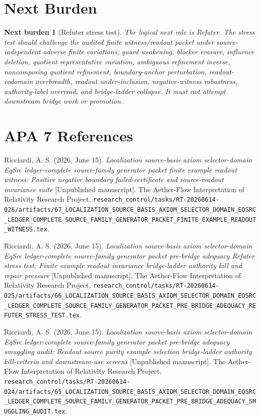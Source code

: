 \documentclass[11pt]{article}
\newtheorem{nextburden}{Next burden}
\begin{document}
\section{Next Burden}

\begin{nextburden}[Refuter stress test]
The logical next role is Refuter. The stress test should challenge the
audited finite witness/readout packet under source-independent adverse
finite variations: guard weakening, blocker erasure, influence deletion,
quotient representative variation, ambiguous refinement inverse,
noncomposing quotient refinement, boundary-anchor perturbation,
readout-codomain overbreadth, readout under-inclusion, negative-witness
robustness, authority-label overread, and bridge-ladder collapse. It
must not attempt downstream bridge work or promotion.
\end{nextburden}

\section*{APA 7 References}

Ricciardi, A. S. (2026, June 15). \emph{Localization source-basis axiom
selector-domain EqSrc ledger-complete source-family generator packet
finite example readout witness: Positive negative boundary
failed-certificate and source-readout invariance suite} [Unpublished
manuscript]. The Aether-Flow Interpretation of Relativity Research
Project,
\texttt{research\_control/tasks/RT-20260614-026/artifacts/67\_LOCALIZATION\_SOURCE\_BASIS\_AXIOM\_SELECTOR\_DOMAIN\_EQSRC\_LEDGER\_COMPLETE\_SOURCE\_FAMILY\_GENERATOR\_PACKET\_FINITE\_EXAMPLE\_READOUT\_WITNESS.tex}.

Ricciardi, A. S. (2026, June 15). \emph{Localization source-basis axiom
selector-domain EqSrc ledger-complete source-family generator packet
pre-bridge adequacy Refuter stress test: Finite example readout
invariance bridge-ladder authority kill and repair pressure}
[Unpublished manuscript]. The Aether-Flow Interpretation of Relativity
Research Project,
\texttt{research\_control/tasks/RT-20260614-025/artifacts/66\_LOCALIZATION\_SOURCE\_BASIS\_AXIOM\_SELECTOR\_DOMAIN\_EQSRC\_LEDGER\_COMPLETE\_SOURCE\_FAMILY\_GENERATOR\_PACKET\_PRE\_BRIDGE\_ADEQUACY\_REFUTER\_STRESS\_TEST.tex}.

Ricciardi, A. S. (2026, June 15). \emph{Localization source-basis axiom
selector-domain EqSrc ledger-complete source-family generator packet
pre-bridge adequacy smuggling audit: Readout source purity example
selection bridge-ladder authority kill-criteria and downstream-use
screens} [Unpublished manuscript]. The Aether-Flow Interpretation of
Relativity Research Project,
\texttt{research\_control/tasks/RT-20260614-024/artifacts/65\_LOCALIZATION\_SOURCE\_BASIS\_AXIOM\_SELECTOR\_DOMAIN\_EQSRC\_LEDGER\_COMPLETE\_SOURCE\_FAMILY\_GENERATOR\_PACKET\_PRE\_BRIDGE\_ADEQUACY\_SMUGGLING\_AUDIT.tex}.
\end{document}
